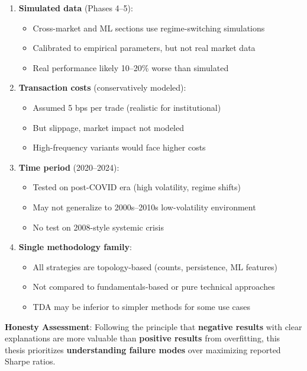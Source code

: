 \begin{enumerate}
\item \textbf{Simulated data} (Phases 4--5):
   \begin{itemize}
   \item Cross-market and ML sections use regime-switching simulations
   \item Calibrated to empirical parameters, but not real market data
   \item Real performance likely 10--20\% worse than simulated
   \end{itemize}

\item \textbf{Transaction costs} (conservatively modeled):
   \begin{itemize}
   \item Assumed 5 bps per trade (realistic for institutional)
   \item But slippage, market impact not modeled
   \item High-frequency variants would face higher costs
   \end{itemize}

\item \textbf{Time period} (2020--2024):
   \begin{itemize}
   \item Tested on post-COVID era (high volatility, regime shifts)
   \item May not generalize to 2000s--2010s low-volatility environment
   \item No test on 2008-style systemic crisis
   \end{itemize}

\item \textbf{Single methodology family}:
   \begin{itemize}
   \item All strategies are topology-based (counts, persistence, ML features)
   \item Not compared to fundamentals-based or pure technical approaches
   \item TDA may be inferior to simpler methods for some use cases
   \end{itemize}
\end{enumerate}

\textbf{Honesty Assessment}: Following the principle that \textbf{negative results} with clear explanations are more valuable than \textbf{positive results} from overfitting, this thesis prioritizes \textbf{understanding failure modes} over maximizing reported Sharpe ratios.

